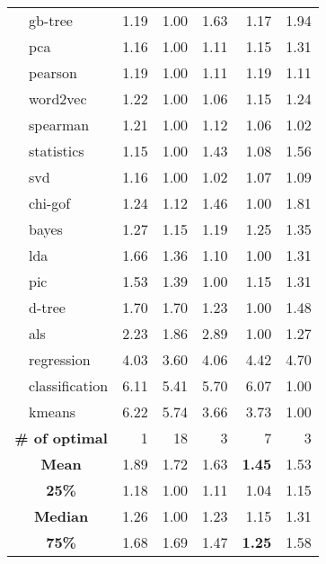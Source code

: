 \begin{table}[!htbp]
{\begin{tabular}{@{}c@{~}l@{~}r@{~}r@{~}r@{~}r@{~}r@{}}
 & gb-tree & 1.19 & 1.00 & 1.63 & 1.17 & 1.94 \\
 & pca & 1.16 & 1.00 & 1.11 & 1.15 & 1.31 \\
 & pearson & 1.19 & 1.00 & 1.11 & 1.19 & 1.11 \\
 & word2vec & 1.22 & 1.00 & 1.06 & 1.15 & 1.24 \\
 & spearman & 1.21 & 1.00 & 1.12 & 1.06 & 1.02 \\
 & statistics & 1.15 & 1.00 & 1.43 & 1.08 & 1.56 \\
 & svd & 1.16 & 1.00 & 1.02 & 1.07 & 1.09 \\
 & chi-gof & 1.24 & 1.12 & 1.46 & 1.00 & 1.81 \\
 & bayes & 1.27 & 1.15 & 1.19 & 1.25 & 1.35 \\
 & lda & 1.66 & 1.36 & 1.10 & 1.00 & 1.31 \\
 & pic & 1.53 & 1.39 & 1.00 & 1.15 & 1.31 \\
 & d-tree & 1.70 & 1.70 & 1.23 & 1.00 & 1.48 \\
 & als & 2.23 & 1.86 & 2.89 & 1.00 & 1.27 \\
 & regression & 4.03 & 3.60 & 4.06 & 4.42 & 4.70 \\
 & classification & 6.11 & 5.41 & 5.70 & 6.07 & 1.00 \\
 & kmeans & 6.22 & 5.74 & 3.66 & 3.73 & 1.00 \\ \midrule
\multicolumn{2}{c}{\textbf{\# of optimal}} & 1 & 18 & 3 & 7 & 3 \\
\multicolumn{2}{c}{\textbf{Mean}} & 1.89 & 1.72 & 1.63 & \textbf{1.45} & 1.53 \\
\multicolumn{2}{c}{\textbf{25\%}} & 1.18 & 1.00 & 1.11 & 1.04 & 1.15 \\
\multicolumn{2}{c}{\textbf{Median}} & 1.26 & 1.00 & 1.23 & 1.15 & 1.31 \\
\multicolumn{2}{c}{\textbf{75\%}} & 1.68 & 1.69 & 1.47 & \textbf{1.25} & 1.58 \\ \bottomrule
\end{tabular}
}
\end{table}

